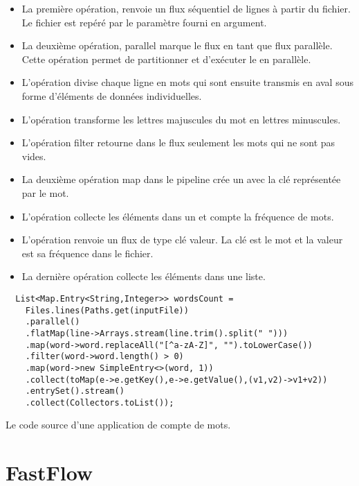 \begin{itemize}
	\item La premi\`ere op\'eration,  renvoie un flux s\'equentiel de lignes \`a partir du fichier. Le fichier est rep\'er\'e par le param\`etre  fourni en argument.

	\item La deuxi\`eme op\'eration, parallel marque le flux en tant que flux parall\`ele. Cette op\'eration permet de partitionner et d'ex\'ecuter le  en parall\`ele.

	\item L'op\'eration  divise chaque ligne en mots qui sont ensuite transmis en aval sous forme d'\'el\'ements de donn\'ees individuelles.
	
	\item L'op\'eration  transforme les lettres majuscules du mot en lettres minuscules.
	
	\item L'op\'eration filter retourne dans le flux seulement les mots qui ne sont pas vides.
	
	\item La deuxi\`eme op\'eration map dans le pipeline cr\'ee un  avec la cl\'e repr\'esent\'ee par le mot.
	
	\item L'op\'eration  collecte les \'el\'ements dans un  et compte la fr\'equence de mots.
	
	\item L'op\'eration  renvoie un flux de type cl\'e valeur. La cl\'e est le mot et la valeur est sa fr\'equence dans le fichier.
	
	\item La derni\`ere op\'eration  collecte les \'el\'ements dans une liste.
	
	
\end{itemize}





\begin{Listing}[tbp]
\begin{lstlisting}
  List<Map.Entry<String,Integer>> wordsCount = 
	Files.lines(Paths.get(inputFile))
    .parallel()
    .flatMap(line->Arrays.stream(line.trim().split(" ")))
    .map(word->word.replaceAll("[^a-zA-Z]", "").toLowerCase())
    .filter(word->word.length() > 0)
    .map(word->new SimpleEntry<>(word, 1))
    .collect(toMap(e->e.getKey(),e->e.getValue(),(v1,v2)->v1+v2))
    .entrySet().stream()
    .collect(Collectors.toList());
\end{lstlisting}
\caption{Le code source d'une application de compte de mots.}
\label{wordCountJava}
\end{Listing}




\section{FastFlow}
